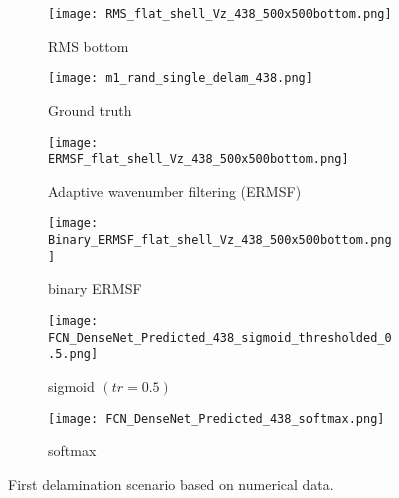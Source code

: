 	\begin{figure} [!h]
		\centering
		\begin{subfigure}[b]{0.47\textwidth}
			\centering
			\texttt{[image: RMS\_flat\_shell\_Vz\_438\_500x500bottom.png]}
			\caption{RMS bottom}
			\label{fig:RMS_flat_shell_Vz_438}
		\end{subfigure}
		\hfill
			\begin{subfigure}[b]{0.47\textwidth}
			\centering
			\texttt{[image: m1\_rand\_single\_delam\_438.png]}
			\caption{Ground truth}
			\label{fig:m1_rand_single_delam_438}
		\end{subfigure}
		\hfill
		\begin{subfigure}[b]{0.47\textwidth}
			\centering
			\texttt{[image: ERMSF\_flat\_shell\_Vz\_438\_500x500bottom.png]}
			\caption{Adaptive wavenumber filtering (ERMSF)}
			\label{fig:ERMSF_flat_shell_Vz_438}
		\end{subfigure}
		\hfill
		\begin{subfigure}[b]{0.47\textwidth}
			\centering
			\texttt{[image: Binary\_ERMSF\_flat\_shell\_Vz\_438\_500x500bottom.png]}
			\caption{binary ERMSF}
			\label{fig:Binary_ERMSF_flat_shell_Vz_438}
		\end{subfigure}
		\hfill
		\begin{subfigure}[b]{0.47\textwidth}
			\centering
		\texttt{[image: FCN\_DenseNet\_Predicted\_438\_sigmoid\_thresholded\_0.5.png]}
		\caption{sigmoid \((tr = 0.5)\)}
		\label{fig:predict_438_sigmoid_tr_0.5}
		\end{subfigure}
		\hfill
		\begin{subfigure}[b]{0.47\textwidth}
			\centering
			\texttt{[image: FCN\_DenseNet\_Predicted\_438\_softmax.png]}
			\caption{softmax}
			\label{fig:predict_438_softmax}
		\end{subfigure}
		\caption{First delamination scenario based on numerical data.}
		\label{fig:RMS438}
	\end{figure} 
	
